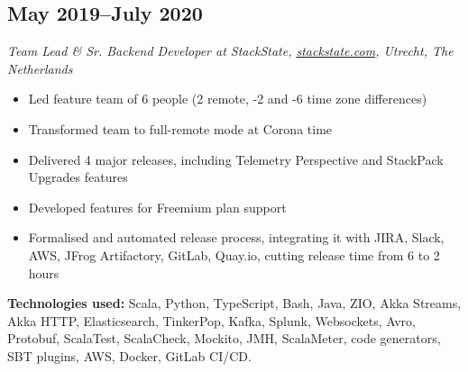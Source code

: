 \subsection*{May 2019--July 2020}

\textit{Team Lead \& Sr. Backend Developer at StackState,
\href{https://stackstate.com}{\url{stackstate.com}}, Utrecht, The
Netherlands}

\begin{itemize}[noitemsep]
  \item Led feature team of 6 people (2 remote, -2 and -6 time zone differences)
  \item Transformed team to full-remote mode at Corona time
  \item Delivered 4 major releases, including Telemetry Perspective and StackPack Upgrades features
  \item Developed features for Freemium plan support
  \item Formalised and automated release process, integrating it with JIRA, Slack, AWS, JFrog Artifactory,
        GitLab, Quay.io, cutting release time from 6 to 2 hours
\end{itemize}

\textbf{Technologies used:}
Scala, Python, TypeScript, Bash, Java, ZIO, Akka Streams, Akka HTTP, Elasticsearch, TinkerPop, Kafka, Splunk,
Websockets, Avro, Protobuf, ScalaTest, ScalaCheck, Mockito, JMH, ScalaMeter, code generators, SBT plugins,
AWS, Docker, GitLab CI/CD.
